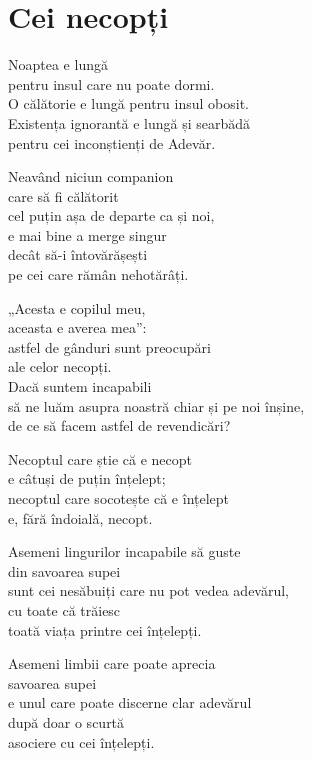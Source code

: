 
\chapter{Cei necopți}

Noaptea e lungă\\
pentru insul care nu poate dormi.\\
O călătorie e lungă pentru insul obosit.\\
Existența ignorantă e lungă și searbădă\\
pentru cei inconștienți de Adevăr.


Neavând niciun companion\\
care să fi călătorit\\
cel puțin așa de departe ca și noi,\\
e mai bine a merge singur\\
decât să-i întovărășești\\
pe cei care rămân nehotărâți.


„Acesta e copilul meu,\\
aceasta e averea mea”:\\
astfel de gânduri sunt preocupări\\
ale celor necopți.\\
Dacă suntem incapabili\\
să ne luăm asupra noastră chiar și pe noi înșine,\\
de ce să facem astfel de revendicări?


Necoptul care știe că e necopt\\
e câtuși de puțin înțelept;\\
necoptul care socotește că e înțelept\\
e, fără îndoială, necopt.


Asemeni lingurilor incapabile să guste\\
din savoarea supei\\
sunt cei nesăbuiți care nu pot vedea adevărul,\\
cu toate că trăiesc\\
toată viața printre cei înțelepți.


Asemeni limbii care poate aprecia\\
savoarea supei\\
e unul care poate discerne clar adevărul\\
după doar o scurtă\\
asociere cu cei înțelepți.


